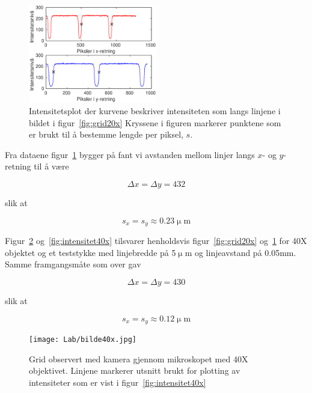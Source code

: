 \documentclass[a4paper,11pt, twocolumn]{article}
\begin{document}
\begin{figure}[!ht]
	\centering
	\includegraphics[width=0.5\textwidth]{Lab/gitter20x.eps}
	\caption{Intensitetsplot der kurvene beskriver intensiteten som langs linjene i bildet i figur~\ref{fig:grid20x} Kryssene i figuren markerer punktene som er brukt til å bestemme lengde per piksel, $s$.}
	\label{fig:intensitet20x}
\end{figure}

Fra dataene figur~\ref{fig:intensitet20x} bygger på fant vi avstanden mellom linjer langs $x$- og $y$-retning til å være

\begin{equation}
	\Delta x = \Delta y = 432
	\label{eq:dxdy20x}
\end{equation}

slik at

\begin{equation}
	s_x=s_y \approx 0.23\upmu\text{m}
	\label{eq:sxsy20x}
\end{equation}

Figur~\ref{fig:grid40x} og~\ref{fig:intensitet40x} tilsvarer henholdsvis figur~\ref{fig:grid20x} og~\ref{fig:intensitet20x} for 40X objektet og et teststykke med linjebredde på 5$\upmu$m og linjeavstand på 0.05mm. Samme framgangsmåte som over gav 

\begin{equation}
	\Delta x=\Delta y=430
	\label{dxdy40x}
\end{equation}

slik at

\begin{equation}
	s_x = s_y \approx 0.12\upmu\text{m}
	\label{eq:sxsy40x}
\end{equation}

\begin{figure}[!ht]
	\centering
	\texttt{[image: Lab/bilde40x.jpg]}
	\caption{Grid observert med kamera gjennom mikroskopet med 40X objektivet. Linjene markerer utsnitt brukt for plotting av intensiteter som er vist i figur~\ref{fig:intensitet40x}}
	\label{fig:grid40x}
\end{figure}
\end{document}
